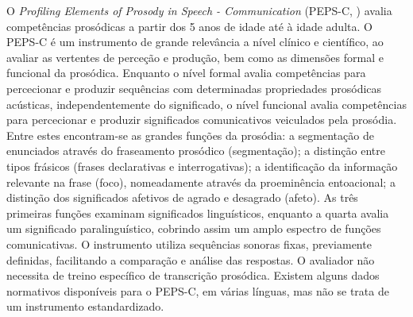 \documentclass[output=paper,colorlinks,citecolor=brown,booklanguage=portuguese]{langscibook}
\begin{document}
O \emph{Profiling Elements of Prosody in Speech - Communication} (PEPS-C, \citealp{McCann2003}) avalia competências prosódicas a partir dos 5 anos de idade até à idade adulta. O PEPS-C é um instrumento de grande relevância a nível clínico e científico, ao avaliar as vertentes de perceção e produção, bem como as dimensões formal e funcional da prosódica. Enquanto o nível formal avalia competências para percecionar e produzir sequências com determinadas propriedades prosódicas acústicas, independentemente do significado, o nível funcional avalia competências para percecionar e produzir significados comunicativos veiculados pela prosódia. Entre estes encontram-se as grandes funções da prosódia: a segmentação de enunciados através do fraseamento prosódico (segmentação); a distinção entre tipos frásicos (frases declarativas e interrogativas); a identificação da informação relevante na frase (foco), nomeadamente através da proeminência entoacional; a distinção dos significados afetivos de agrado e desagrado (afeto). As três primeiras funções examinam significados linguísticos, enquanto a quarta avalia um significado paralinguístico, cobrindo assim um amplo espectro de funções comunicativas. O instrumento utiliza sequências sonoras fixas, previamente definidas, facilitando a comparação e análise das respostas. O avaliador não necessita de treino específico de transcrição prosódica. Existem alguns dados normativos disponíveis para o PEPS-C, em várias línguas, mas não se trata de um instrumento estandardizado.
\end{document}
